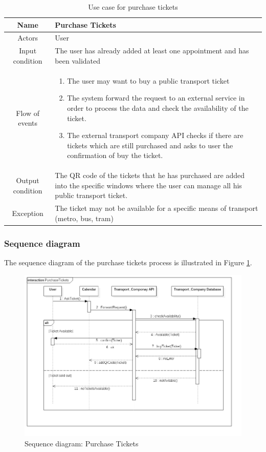\begin{table}
\centering
	\begin{tabular}{|c||p{}|}
    \hline
    Name & Purchase Tickets \\ \hline
    Actors & User \\  \hline
    Input condition & The user has already added at least one appointment and has been validated \\ \hline
    Flow of events & \begin{enumerate}
    \item The user may want to buy a public transport ticket
    \item The system forward the request to an external service in order to process the data and check the availability of the ticket.
    \item The external transport company API checks if there are tickets which 				are still purchased and asks to user the confirmation of buy the ticket.
    \end{enumerate} \\ \hline
     Output condition & The QR code of the tickets that he has purchased are added into the specific windows where the user can manage all his public transport ticket. \\ \hline
     Exception & The ticket may not be available for a specific means of transport (metro, bus, tram) \\ \hline
	\end{tabular}
\caption{Use case for purchase tickets}
\label{usecase_tickets}
\end{table}

\subsubsection{Sequence diagram}
The sequence diagram of the purchase tickets process is illustrated in Figure \ref{fig:useCaseMobility}.
\begin{figure}
	\centering
	\includegraphics[width=6in]{./diagrams/PurchaseTickets.png}
	\caption{Sequence diagram: Purchase Tickets}
	\label{fig:useCaseMobility}
\end{figure}